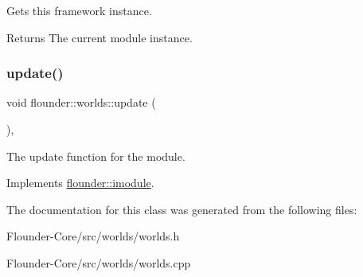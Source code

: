 Gets this framework instance. 

\begin{DoxyReturn}{Returns}
The current module instance. 
\end{DoxyReturn}
\mbox{\label{classflounder_1_1worlds_af1cdfac9ca2a2fc2768a9db4c1c22967}} 
\subsubsection{\texorpdfstring{update()}{update()}}
{\footnotesize\ttfamily void flounder\+::worlds\+::update (\begin{DoxyParamCaption}{ }\end{DoxyParamCaption})\hspace{0.3cm}{\ttfamily [override]}, {\ttfamily [virtual]}}



The update function for the module. 



Implements \hyperlink{classflounder_1_1imodule_a9a53d48a46b5f6b16a92b2cd8503f74a}{flounder\+::imodule}.



The documentation for this class was generated from the following files\+:\begin{DoxyCompactItemize}
\item 
Flounder-\/\+Core/src/worlds/worlds.\+h\item 
Flounder-\/\+Core/src/worlds/worlds.\+cpp\end{DoxyCompactItemize}
